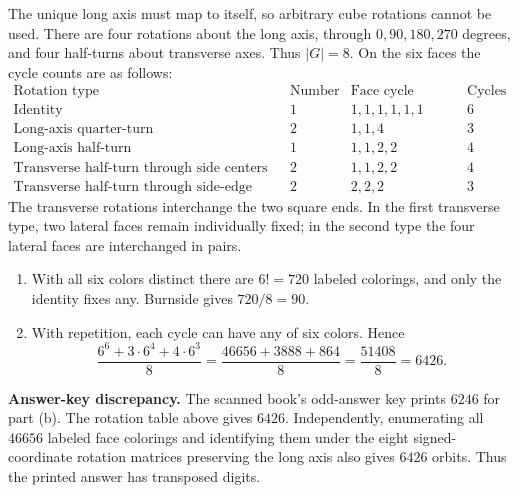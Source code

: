 The unique long axis must map to itself, so arbitrary cube rotations
cannot be used. There are four rotations about the long axis, through
$0,90,180,270$ degrees, and four half-turns about transverse axes. Thus
$|G|=8$. On the six faces the cycle counts are as follows:
\[
\begin{array}{l|r|c|r}
\text{Rotation type}&\text{Number}&\text{Face cycle lengths}&\text{Cycles}\\\hline
\text{Identity}&1&1,1,1,1,1,1&6\\
\text{Long-axis quarter-turn}&2&1,1,4&3\\
\text{Long-axis half-turn}&1&1,1,2,2&4\\
\text{Transverse half-turn through side centers}&2&1,1,2,2&4\\
\text{Transverse half-turn through side-edge midpoints}&2&2,2,2&3
\end{array}
\]
The transverse rotations interchange the two square ends. In the first
transverse type, two lateral faces remain individually fixed; in the
second type the four lateral faces are interchanged in pairs.
\begin{enumerate}[label=(\alph*)]
\item With all six colors distinct there are $6!=720$ labeled colorings,
and only the identity fixes any. Burnside gives $720/8=\boxed{90}$.
\item With repetition, each cycle can have any of six colors. Hence
\[
\frac{6^6+3\cdot6^4+4\cdot6^3}{8}
=\frac{46656+3888+864}{8}
=\frac{51408}{8}=\boxed{6426}.
\]
\end{enumerate}
\textbf{Answer-key discrepancy.} The scanned book's odd-answer key prints
$6246$ for part (b). The rotation table above gives $6426$. Independently,
enumerating all $46656$ labeled face colorings and identifying them under
the eight signed-coordinate rotation matrices preserving the long axis
also gives $6426$ orbits. Thus the printed answer has transposed digits.
